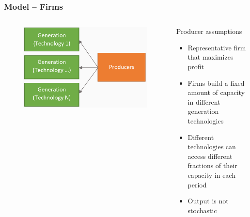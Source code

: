 \documentclass[aspectratio=169]{beamer}
\begin{document}
	\begin{frame}
		\frametitle{Model -- Firms}
		
		
		\begin{columns}[T]%
			
			\begin{figure}
				\includegraphics[width=1\textwidth]{../figures/model_diagram_prod.png} 
			\end{figure}
			
			\begin{block}{Producer assumptions}
				\begin{itemize}
					\setlength\itemsep{0.25em}
					\item Representative firm that maximizes profit
					\item Firms build a fixed amount of capacity in different generation technologies
					\item Different technologies can access different fractions of their capacity in each period
					\item Output is not stochastic
				\end{itemize}
			\end{block}
			
		\end{columns}
		
		
		
		
	\end{frame}
	
\end{document}
